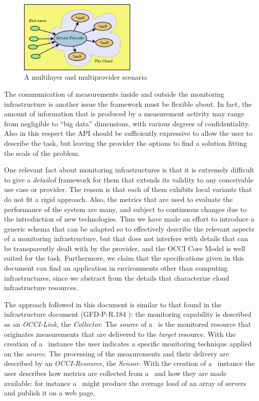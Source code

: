 \documentclass[10pt,a4paper]{article}
\begin{document}
\begin{figure}[b]
\centering
\includegraphics[width=0.5\textwidth]{figs/multilayer.pdf}
\caption{A multilayer and multiprovider scenario \label{img:scenario}}
\end{figure}

The communication of measurements inside and outside the monitoring infrastructure is another issue the framework must be flexible about. In fact, the amount of information that is produced by a measurement activity may range from negligible to ``big data'' dimensions, with various degrees of confidentiality. Also in this respect the API should be sufficiently expressive to allow the user to describe the task, but leaving the provider the options to find a solution fitting the scale of the problem.

One relevant fact about monitoring infrastructures is that it is extremely difficult to give a {\em detailed} framework for them that extends its validity to any conceivable use case or provider. The reason is that each of them exhibits local variants that do not fit a rigid approach. Also, the metrics that are used to evaluate the performance of the system are many, and subject to continuous changes due to the introduction of new technologies. Thus we have made an effort to introduce a generic schema that can be adapted so to effectively describe the relevant aspects of a monitoring infrastructure, but that does not interfere with details that can be transparently dealt with by the provider, and the OCCI Core Model \cite{occi:core} is well suited for the task. Furthermore, we claim that the specifications given in this document can find an application in environments other than computing infrastructures, since we abstract from the details that characterize cloud infrastructure resources.

The approach followed in this document is similar to that found in the infrastructure document (GFD-P-R.184 \cite{occi:infrastructure}): the monitoring capability is described as an {\em OCCI-Link}, the {\em Collector}. The {\em source} of a \coll\ is the monitored resource that originates measurements that are delivered to the {\em target} resource. With the creation of a \coll\ instance the user indicates a specific monitoring technique applied on the {\em source}. The processing of the measurements and their delivery are described by an {\em OCCI-Resource}, the {\em Sensor}. With the creation of a \sens\ instance the user describes how metrics are collected from a \coll\ and how they are made available: for instance a \sens\ might produce the average load of an array of servers and publish it on a web page.
\end{document}
